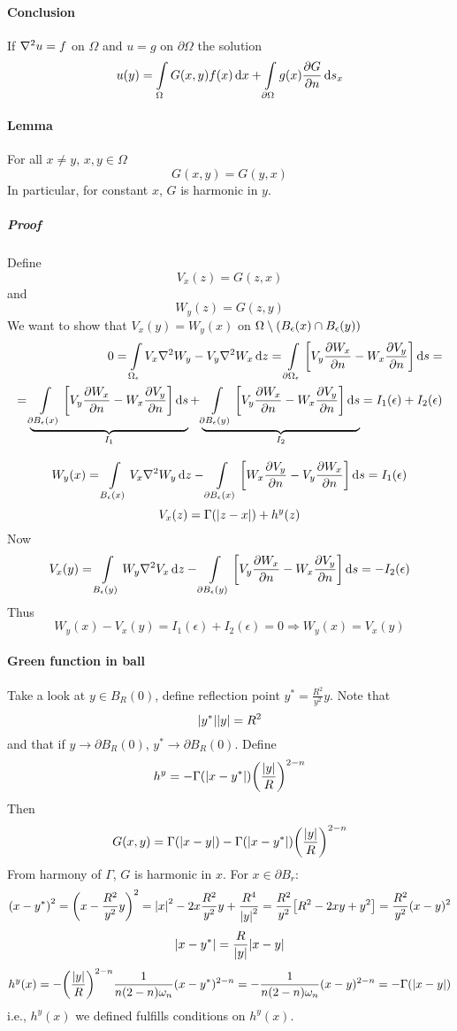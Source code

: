 \paragraph{Conclusion}
If $\laplacian{u} = f$ on $\Omega$ and $u=g$ on $\partial \Omega$
the solution
$$u(y) = \int\limits_{\Omega} G(x,y) f(x) \dd{x} + \int\limits_{\partial \Omega} g(x) \pdv{G}{n} \dd{s_x} $$
\paragraph{Lemma}
For all $x\neq y$, $x,y \in \Omega$
$$G(x,y) = G(y,x)$$
In particular, for constant $x$, $G$ is harmonic in $y$.
\subparagraph{Proof}
Define
$$V_x(z) = G(z,x)$$
and
$$W_y(z) = G(z,y)$$
We want to show that $V_x(y)= W_y(x)$ on $\Omega \setminus \qty(B_\epsilon(x) \cap B_\epsilon(y))$
\begin{align*}
0 = \int\limits_{\Omega_\epsilon} V_x\laplacian{W_y} -  V_y\laplacian{W_x} \dd{z} = \int\limits_{\partial \Omega_\epsilon} \qty[V_y \pdv{W_x}{n} - W_x \pdv{V_y}{n}] \dd{s} =\\= \underbrace{\int\limits_{\partial B_\epsilon(x) }\qty[V_y \pdv{W_x}{n} - W_x \pdv{V_y}{n}] \dd{s}}_{I_1} + \underbrace{\int\limits_{\partial B_\epsilon(y)} \qty[V_y \pdv{W_x}{n} - W_x \pdv{V_y}{n}] \dd{s}}_{I_2} = I_1(\epsilon) + I_2(\epsilon)
\end{align*}
$$$$
$$W_y(x) = \int\limits_{B_\epsilon(x)} V_x\laplacian{W_y} \dd{z} - \int\limits_{\partial B_\epsilon(x) }\qty[W_x \pdv{V_y}{n} - V_y \pdv{W_x}{n} ] \dd{s} = I_1(\epsilon)$$
$$V_x(z) = \Gamma(\abs{z-x}) + h^y(z)$$
Now
$$V_x(y) = \int\limits_{B_\epsilon(y)} W_y\laplacian{V_x} \dd{z} -  \int\limits_{\partial B_\epsilon(y)} \qty[V_y \pdv{W_x}{n} - W_x \pdv{V_y}{n}] \dd{s} = -I_2(\epsilon)$$
Thus
$$W_y(x) - V_x(y) = I_1(\epsilon) + I_2(\epsilon) = 0 \Rightarrow  W_y(x) = V_x(y)$$

\paragraph{Green function in ball}
Take a look at $y\in B_R(0)$, define reflection point $y^* = \frac{R^2}{y^2}y$. Note that
$$\abs{y^*}\abs{y} = R^2$$
and that if $y\to \partial B_R(0)$, $y^{*}\to \partial B_R(0)$.
Define
$$h^y = -\Gamma\qty(\abs{x-y^*}) \qty(\frac{\abs{y}}{R})^{2-n}$$
Then
$$G(x,y) =\Gamma(\abs{x-y}) -\Gamma\qty(\abs{x-y^*}) \qty(\frac{\abs{y}}{R})^{2-n}$$
From harmony of $\Gamma$, $G$ is harmonic in $x$. For $x \in \partial B_r$:
$$\qty(x-y^*)^2 = \qty(x - \frac{R^2}{y^2}y)^2 = \abs{x}^2 - 2x\frac{R^2}{y^2}y + \frac{R^4}{\abs{y}^2} = \frac{R^2}{y^2} \qty[R^2 - 2xy + y^2] = \frac{R^2}{y^2} (x-y)^2$$
$$\abs{x-y^*} = \frac{R}{\abs{y}} \abs{x-y}  $$
$$h^y(x) = - \qty(\frac{\abs{y}}{R})^{2-n} \frac{1}{n(2-n)\omega_n}(x-y^*)^{2-n} = -\frac{1}{n(2-n)\omega_n} (x-y)^{2-n} = -\Gamma(\abs{x-y})$$
i.e., $h^y(x)$ we defined fulfills conditions on $h^y(x)$.

